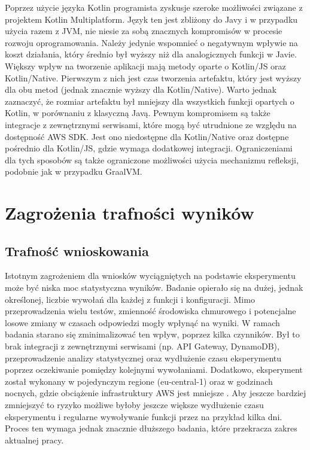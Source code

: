 Poprzez użycie języka Kotlin programista zyskusje szeroke możliwości związane z projektem Kotlin Multiplatform.
Język ten jest zbliżony do Javy i w przypadku użycia razem z JVM, nie niesie za sobą znacznych kompromisów w procesie rozwoju oprogramowania.
Należy jedynie wspomnieć o negatywnym wpływie na koszt działania, który średnio był wyższy niż dla analogicznych funkcji w Javie.
Większy wpływ na tworzenie aplikacji mają metody oparte o Kotlin/JS oraz Kotlin/Native.
Pierwszym z nich jest czas tworzenia artefaktu, który jest wyższy dla obu metod (jednak znacznie wyższy dla Kotlin/Native).
Warto jednak zaznaczyć, że rozmiar artefaktu był mniejszy dla wszystkich funkcji opartych o Kotlin, w porównaniu z klasyczną Javą.
Pewnym kompromisem są także integracje z zewnętrznymi serwisami, które mogą być utrudnione ze względu na dostępność AWS SDK.
Jest ono niedostępne dla Kotlin/Native oraz dostępne pośrednio dla Kotlin/JS, gdzie wymaga dodatkowej integracji.
Ograniczeniami dla tych sposobów są także ograniczone możliwości użycia mechanizmu refleksji, podobnie jak w przypadku GraalVM.

\section{Zagrożenia trafności wyników}\label{chapter:zagrozenia_trafnosci_wynikow}


\subsection*{Trafność wnioskowania}

Istotnym zagrożeniem dla wniosków wyciągniętych na podstawie eksperymentu może być niska moc statystyczna wyników. 
Badanie opierało się na dużej, jednak określonej, liczbie wywołań dla każdej z funkcji i konfiguracji. 
Mimo przeprowadzenia wielu testów, zmienność środowiska chmurowego i potencjalne losowe zmiany w czasach odpowiedzi mogły wpłynąć na wyniki. 
W ramach badania starano się zminimalizować ten wpływ, poprzez kilka czynników. 
Był to brak integracji z zewnętrznymi serwisami (np. API Gateway, DynamoDB), przeprowadzenie analizy statystycznej oraz wydłużenie czasu eksperymentu poprzez oczekiwanie pomiędzy kolejnymi wywołaniami.
Dodatkowo, eksperyment został wykonany w pojedynczym regione (eu-central-1) oraz w godzinach nocnych, gdzie obciążenie infrastruktury AWS jest mniejsze \cite{10.1145/3491204.3543506}.
Aby jeszcze bardziej zmniejszyć to ryzyko możliwe byłoby jeszcze większe wydłużenie czasu eksperymentu i regularne wywoływanie funkcji przez na przykład kilka dni.
Proces ten wymaga jednak znacznie dłuższego badania, które przekracza zakres aktualnej pracy.

